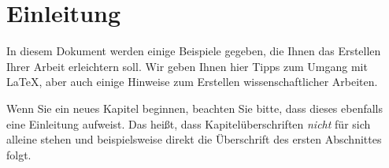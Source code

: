 \chapter{Einleitung}
\label{cha:Einleitung}

In diesem Dokument werden einige Beispiele gegeben, die Ihnen das Erstellen Ihrer Arbeit erleichtern soll. Wir geben Ihnen hier Tipps zum Umgang mit \LaTeX, aber auch einige Hinweise zum Erstellen wissenschaftlicher Arbeiten. 

Wenn Sie ein neues Kapitel beginnen, beachten Sie bitte, dass dieses ebenfalls eine Einleitung aufweist. Das heißt, dass Kapitelüberschriften \textit{nicht} für sich alleine stehen und beispielsweise direkt die Überschrift des ersten Abschnittes folgt.